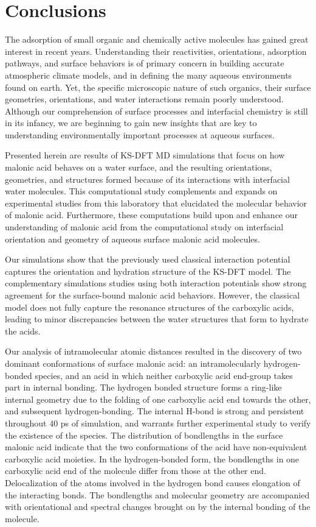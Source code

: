 \section {Conclusions}

The adsorption of small organic and chemically active molecules has gained great interest in recent years. Understanding their reactivities, orientations, adsorption pathways, and surface behaviors is of primary concern in building accurate atmospheric climate models, and in defining the many aqueous environments found on earth. Yet, the specific microscopic nature of such organics, their surface geometries, orientations, and water interactions remain poorly understood. Although our comprehension of surface processes and interfacial chemistry is still in its infancy, we are beginning to gain new insights that are key to understanding environmentally important processes at aqueous surfaces.

Presented herein are results of KS-DFT MD simulations that focus on how malonic acid behaves on a water surface, and the resulting orientations, geometries, and structures formed because of its interactions with interfacial water molecules. This computational study complements and expands on experimental studies from this laboratory that elucidated the molecular behavior of malonic acid.\cite{Blower2012} Furthermore, these computations build upon and enhance our understanding of malonic acid from the computational study on interfacial orientation and geometry of aqueous surface malonic acid molecules.

Our simulations show that the previously used classical interaction potential captures the orientation and hydration structure of the KS-DFT model. The complementary simulations studies using both interaction potentials show strong agreement for the surface-bound malonic acid behaviors. However, the classical model does not fully capture the resonance structures of the carboxylic acids, leading to minor discrepancies between the water structures that form to hydrate the acids.

Our analysis of intramolecular atomic distances resulted in the discovery of two dominant conformations of surface malonic acid: an intramolecularly hydrogen-bonded species, and an acid in which neither carboxylic acid end-group takes part in internal bonding. The hydrogen bonded structure forms a ring-like internal geometry due to the folding of one carboxylic acid end towards the other, and subsequent hydrogen-bonding. The internal H-bond is strong and persistent throughout 40 ps of simulation, and warrants further experimental study to verify the existence of the species. The distribution of bondlengths in the surface malonic acid indicate that the two conformations of the acid have non-equivalent carboxylic acid moieties. In the hydrogen-bonded form, the bondlengths in one carboxylic acid end of the molecule differ from those at the other end. Delocalization of the atoms involved in the hydrogen bond causes elongation of the interacting bonds. The bondlengths and molecular geometry are accompanied with orientational and spectral changes brought on by the internal bonding of the molecule.

